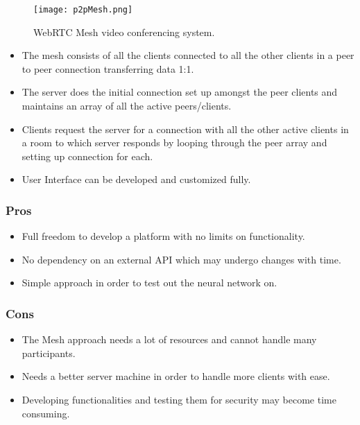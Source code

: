 \begin{figure}
    \begin{center}
        \texttt{[image: p2pMesh.png]}
    \end{center}
    \caption{WebRTC Mesh video conferencing system.}
    \label{fig:p2pMesh}
\end{figure}

\begin{itemize}
    \item The mesh consists of all the clients connected to all the other clients in a peer to peer connection transferring data 1:1.
    \item The server does the initial connection set up amongst the peer clients and maintains an array of all the active peers/clients.
    \item Clients request the server for a connection with all the other active clients in a room to which server responds by looping through the peer array and setting up connection for each.
    \item User Interface can be developed and customized fully.
\end{itemize}

\subsubsection{Pros}

\begin{itemize}
    \item Full freedom to develop a platform with no limits on functionality.
    \item No dependency on an external API which may undergo changes with time.
    \item Simple approach in order to test out the neural network on.
\end{itemize}

\subsubsection{Cons}

\begin{itemize}
    \item The Mesh approach needs a lot of resources and cannot handle many participants.
    \item Needs a better server machine in order to handle more clients with ease.
    \item Developing functionalities and testing them for security may become time consuming.
\end{itemize}

